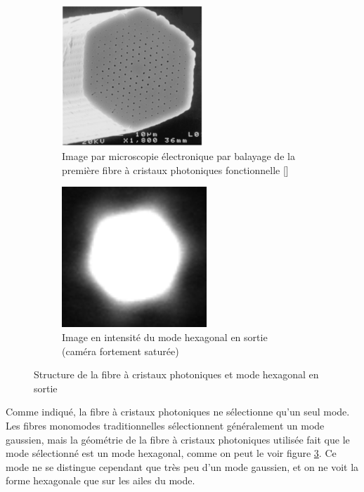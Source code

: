 \documentclass[11pt,a4paper]{article}
\newcommand{\ncite}[1]{[\citenum{#1}]}
\begin{document}
\begin{figure}[htpb]  
\centering
\begin{subfigure}[t]{0.48\textwidth}
	\centering
	\includegraphics[height=5.3cm]{./img/solid core PCF - russell2006}
	\captionsetup{width=5.7cm}%
	\caption{Image par microscopie électronique par balayage de la première fibre à cristaux photoniques fonctionnelle \ncite{russell2006}}
	\label{fig:PCF}
\end{subfigure}
\begin{subfigure}[t]{0.48\textwidth}
	\centering
	\includegraphics[height=5.3cm]{./img/mode hexa.png}
	\captionsetup{width=5.7cm}
	\caption{Image en intensité du mode hexagonal en sortie (caméra fortement saturée)}
	\label{fig:hexa}
\end{subfigure}
\hspace*{-0.8cm}
\caption{Structure de la fibre à cristaux photoniques et mode hexagonal en sortie}
\end{figure}

Comme indiqué, la fibre à cristaux photoniques ne sélectionne qu'un seul mode. Les fibres monomodes traditionnelles sélectionnent généralement un mode gaussien, mais la géométrie de la fibre à cristaux photoniques utilisée fait que le mode sélectionné est un mode hexagonal, comme on peut le voir figure \ref{fig:hexa}. Ce mode ne se distingue cependant que très peu d'un mode gaussien, et on ne voit la forme hexagonale que sur les ailes du mode.
\end{document}
